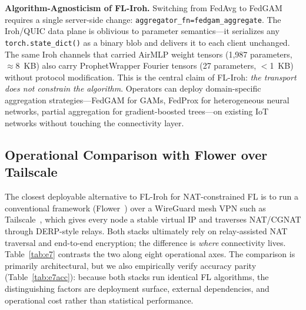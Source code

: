 ﻿\documentclass[journal]{IEEEtran}
\begin{document}
\textbf{Algorithm-Agnosticism of FL-Iroh.} Switching from FedAvg to FedGAM requires a single server-side change: \texttt{aggregator\_fn=fedgam\_aggregate}. The Iroh/QUIC data plane is oblivious to parameter semantics---it serializes any \texttt{torch.state\_dict()} as a binary blob and delivers it to each client unchanged. The same Iroh channels that carried AirMLP weight tensors (1{,}987 parameters, $\approx$8~KB) also carry ProphetWrapper Fourier tensors (27 parameters, $<$1~KB) without protocol modification. This is the central claim of FL-Iroh: \emph{the transport does not constrain the algorithm}. Operators can deploy domain-specific aggregation strategies---FedGAM for GAMs, FedProx for heterogeneous neural networks, partial aggregation for gradient-boosted trees---on existing IoT networks without touching the connectivity layer.

\subsection{Operational Comparison with Flower over Tailscale}
\label{sec:e7}

The closest deployable alternative to FL-Iroh for NAT-constrained FL is to run a conventional framework (Flower~\cite{flower2022}) over a WireGuard mesh VPN such as Tailscale~\cite{tailscale2023}, which gives every node a stable virtual IP and traverses NAT/CGNAT through DERP-style relays. Both stacks ultimately rely on relay-assisted NAT traversal and end-to-end encryption; the difference is \emph{where} connectivity lives. Table~\ref{tab:e7} contrasts the two along eight operational axes. The comparison is primarily architectural, but we also empirically verify accuracy parity (Table~\ref{tab:e7acc}): because both stacks run identical FL algorithms, the distinguishing factors are deployment surface, external dependencies, and operational cost rather than statistical performance.
\end{document}
